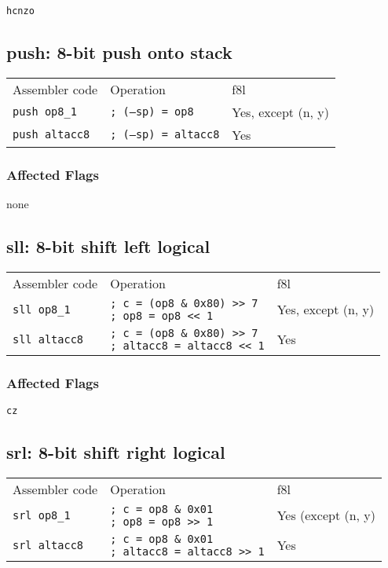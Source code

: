 \documentclass{book}
\begin{document}
\texttt{hcnzo}


\subsection{push: 8-bit push onto stack}

\begin{tabular}{l l l}
Assembler code        & Operation                   & f8l \\
\texttt{push op8\_1}  & \texttt{; (--sp) = op8}     & Yes, except (n, y) \\
\texttt{push altacc8} & \texttt{; (--sp) = altacc8} & Yes
\end{tabular}

\subsubsection*{Affected Flags}

none


\subsection{sll: 8-bit shift left logical}

\begin{tabular}{l l l}
Assembler code       & Operation                                                                       & f8l \\
\texttt{sll op8\_1}  & \makecell{\texttt{; c = (op8 \& 0x80) >> 7}\\\texttt{; op8 = op8 << 1}}         & Yes, except (n, y) \\
\texttt{sll altacc8} & \makecell{\texttt{; c = (op8 \& 0x80) >> 7}\\\texttt{; altacc8 = altacc8 << 1}} & Yes
\end{tabular}

\subsubsection*{Affected Flags}

\texttt{cz}


\subsection{srl: 8-bit shift right logical}

\begin{tabular}{l l l}
Assembler code       & Operation                                                                & f8l \\
\texttt{srl op8\_1}  & \makecell{\texttt{; c = op8 \& 0x01}\\\texttt{; op8 = op8 >> 1}}         & Yes (except (n, y) \\
\texttt{srl altacc8} & \makecell{\texttt{; c = op8 \& 0x01}\\\texttt{; altacc8 = altacc8 >> 1}} & Yes
\end{tabular}
\end{document}
